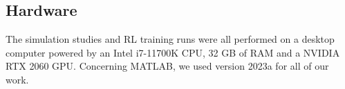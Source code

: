 \subsection{Hardware}
The simulation studies and RL training runs were all performed on a desktop computer powered by an Intel i7-11700K CPU, 32 GB of RAM and a NVIDIA RTX 2060 GPU.
Concerning MATLAB, we used version 2023a for all of our work.

